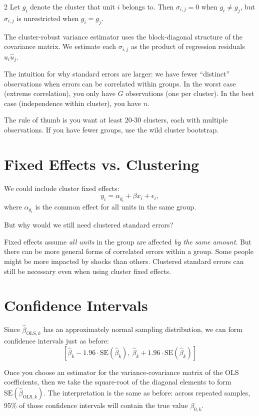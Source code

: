 \documentclass[12pt]{article}
\begin{document}
\begin{multicols}{2}
  Let $g_i$ denote the cluster that unit $i$ belongs to.
  Then $\sigma_{i,j} = 0$ when $g_i \neq g_j$, but $\sigma_{i,j}$ is unrestricted when $g_i = g_j$.

  The cluster-robust variance estimator uses the block-diagonal structure of the covariance matrix. We estimate each $\sigma_{i,j}$ as the product of regression residuals $\hat{u}_i \hat{u}_j$.

  The intuition for why standard errors are larger: we have fewer ``distinct'' observations when errors can be correlated within groups.
  In the worst case (extreme correlation), you only have $G$ observations (one per cluster).
  In the best case (independence within cluster), you have $n$.

  The rule of thumb is you want at least 20-30 clusters, each with multiple observations.
  If you have fewer groups, use the wild cluster bootstrap.

  \section*{Fixed Effects vs. Clustering}

  We could include cluster fixed effects:
  $$y_i = \alpha_{g_i} + \beta x_i + \epsilon_i,$$
  where $\alpha_{g_i}$ is the common effect for all units in the same group.

  But why would we still need clustered standard errors?

  Fixed effects assume \emph{all units} in the group are affected \emph{by the same amount}. But there can be more general forms of correlated errors within a group. Some people might be more impacted by shocks than others. Clustered standard errors can still be necessary even when using cluster fixed effects.

  \section*{Confidence Intervals}

  Since $\hat{\beta}_{\text{OLS}, k}$ has an approximately normal sampling distribution, we can form confidence intervals just as before:
  $$
  \left[ \hat{\beta}_{k} - 1.96 \cdot \text{SE}(\hat{\beta}_{k}), \ \hat{\beta}_{k} + 1.96 \cdot \text{SE}(\hat{\beta}_{k}) \right]
  $$

  Once you choose an estimator for the variance-covariance matrix of the OLS coefficients, then we take the square-root of the diagonal elements to form $\text{SE}(\hat{\beta}_{\text{OLS}, k})$.
  The interpretation is the same as before: across repeated samples, 95\% of those confidence intervals will contain the true value $\beta_{0,k}$.


\end{multicols}
\end{document}
